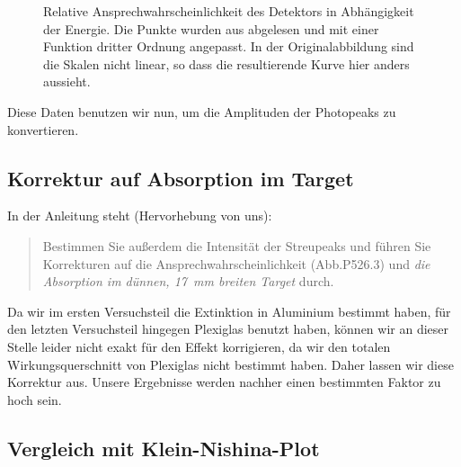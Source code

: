 \documentclass[11pt, ngerman, fleqn, DIV=15, headinclude, BCOR=2cm]{scrreprt}
\begin{document}
\begin{figure}[htbp]
    \centering
    \caption{%
        Relative Ansprechwahrscheinlichkeit des Detektors in Abhängigkeit der
        Energie. Die Punkte wurden aus
         abgelesen und mit
        einer Funktion dritter Ordnung angepasst. In der Originalabbildung sind
        die Skalen nicht linear, so dass die resultierende Kurve hier anders
        aussieht.
    }
    \label{fig:Ansprech-fit}
\end{figure}

Diese Daten benutzen wir nun, um die Amplituden der Photopeaks zu konvertieren.

\subsection{Korrektur auf Absorption im Target}

In der Anleitung steht (Hervorhebung von uns):
\begin{quote}
    Bestimmen Sie außerdem die Intensität der Streupeaks und führen Sie
    Korrekturen auf die Ansprechwahrscheinlichkeit (Abb.P526.3) und \emph{die
    Absorption im dünnen, \SI{17}{\milli\meter} breiten Target} durch.
    \parencite[4]{physik512-Anleitung}
\end{quote}

Da wir im ersten Versuchsteil die Extinktion in Aluminium bestimmt haben, für
den letzten Versuchsteil hingegen Plexiglas benutzt haben, können wir an dieser
Stelle leider nicht exakt für den Effekt korrigieren, da wir den totalen
Wirkungsquerschnitt von Plexiglas nicht bestimmt haben. Daher lassen wir diese
Korrektur aus. Unsere Ergebnisse werden nachher einen bestimmten Faktor zu hoch
sein.

\subsection{Vergleich mit Klein-Nishina-Plot}
\end{document}
